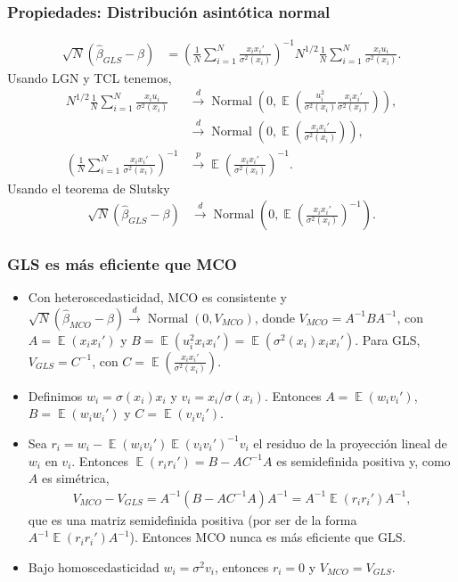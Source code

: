 \documentclass[t, compress, spanish, aspectratio=169]{beamer}
\newcommand{\compactmath}{\setlength{\abovedisplayskip}{3pt}\setlength{\belowdisplayskip}{3pt}\setlength{\abovedisplayshortskip}{0pt}\setlength{\belowdisplayshortskip}{2pt}\setlength{\jot}{1pt}} %
\DeclareMathOperator{\N}{Normal}
\DeclareMathOperator{\E}{\mathbb{E}}
\newcommand{\pto}{\stackrel{p}{\longrightarrow}}
\newcommand{\dto}{\stackrel{d}{\longrightarrow}}
\begin{document}
\begin{frame}\compactmath
    \frametitle{Propiedades: Distribuci\'on asint\'otica normal}\vspace{-6pt}
    \footnotesize\compactmath
        \begin{align*}
            \sqrt{N} (\hat \beta_{GLS} - \beta)&= \left( \frac{1}{N}\sum_{i=1}^{N} \frac{x_ix_i'}{\sigma^2(x_i)}\right)^{-1 }N^{1/2} \frac{1}{N} \sum_{i=1}^{N} \frac{x_iu_i}{\sigma^2(x_i)}.
        \end{align*}
        Usando LGN y TCL tenemos,
        \begin{align*}
            N^{1/2} \frac{1}{N} \sum_{i=1}^{N} \frac{x_iu_i}{\sigma^2(x_i)} &\dto \N \left(0,\E\left(\frac{u_i^2}{\sigma^2(x_i)} \frac{x_i x_i'}{\sigma^2(x_i)}\right)\right),\\
            &\dto \N \left(0,\E\left(\frac{x_i x_i'}{\sigma^2(x_i)}\right)\right),\\
           \left( \frac{1}{N}\sum_{i=1}^{N} \frac{x_ix_i'}{\sigma^2(x_i)}\right)^{-1 }&\pto  \E\left(\frac{x_ix_i'}{\sigma^2(x_i)}\right)^{-1 } .
        \end{align*}
        Usando el teorema de Slutsky
        \begin{align*}
            \sqrt{N} (\hat \beta_{GLS} - \beta) &\dto \N \left(0,\E\left(\frac{x_i x_i'}{\sigma^2(x_i)}\right)^{-1}\right).
        \end{align*}
\end{frame}
\begin{frame}
    \frametitle{GLS es m\'as eficiente que MCO}
    \small
    \begin{itemize}
        \item Con heteroscedasticidad, MCO es consistente y $\sqrt{N}(\hat\beta_{MCO}-\beta)\dto \N(0,V_{MCO})$, donde $V_{MCO}=A^{-1}BA^{-1}$, con $A=\E(x_ix_i')$ y $B=\E(u_i^2x_ix_i')=\E(\sigma^2(x_i)x_ix_i')$. Para GLS, $V_{GLS}=C^{-1}$, con $C=\E\left(\frac{x_ix_i'}{\sigma^2(x_i)}\right)$.
        \item Definimos $w_i=\sigma(x_i)x_i$ y $v_i=x_i/\sigma(x_i)$. Entonces $A=\E(w_iv_i')$, $B=\E(w_iw_i')$ y $C=\E(v_iv_i')$.
        \item Sea $r_i=w_i-\E(w_iv_i')\E(v_iv_i')^{-1}v_i$ el residuo de la proyecci\'on lineal de $w_i$ en $v_i$. Entonces $\E(r_ir_i')=B-AC^{-1}A$ es semidefinida positiva y, como $A$ es sim\'etrica,
        \begin{align*}
            V_{MCO}-V_{GLS}=A^{-1}\left(B-AC^{-1}A\right)A^{-1}=A^{-1}\E(r_ir_i')A^{-1},
        \end{align*}
        que es una matriz semidefinida positiva (por ser de la forma $A^{-1}\E(r_ir_i')A^{-1}$). Entonces MCO nunca es m\'as eficiente que GLS.
        \item Bajo homoscedasticidad $w_i=\sigma^2v_i$, entonces $r_i=0$ y $V_{MCO}=V_{GLS}$.
    \end{itemize}
\end{frame}
\end{document}
